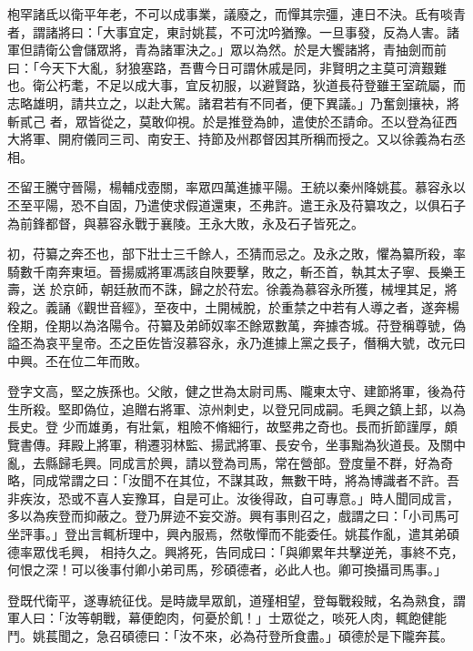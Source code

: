 \begin{pinyinscope}
 枹罕諸氐以衛平年老，不可以成事業，議廢之，而憚其宗彊，連日不決。氐有啖青者，謂諸將曰：「大事宜定，東討姚萇，不可沈吟猶豫。一旦事發，反為人害。諸軍但請衛公會儲眾將，青為諸軍決之。」眾以為然。於是大饗諸將，青抽劍而前曰：「今天下大亂，豺狼塞路，吾曹今日可謂休戚是同，非賢明之主莫可濟艱難也。衛公朽耄，不足以成大事，宜反初服，以避賢路，狄道長苻登雖王室疏屬，而志略雄明，請共立之，以赴大駕。諸君若有不同者，便下異議。」乃奮劍攘袂，將斬貳己
 者，眾皆從之，莫敢仰視。於是推登為帥，遣使於丕請命。丕以登為征西大將軍、開府儀同三司、南安王、持節及州郡督因其所稱而授之。又以徐義為右丞相。



 丕留王騰守晉陽，楊輔戍壺關，率眾四萬進據平陽。王統以秦州降姚萇。慕容永以丕至平陽，恐不自固，乃遣使求假道還東，丕弗許。遣王永及苻纂攻之，以俱石子為前鋒都督，與慕容永戰于襄陵。王永大敗，永及石子皆死之。



 初，苻纂之奔丕也，部下壯士三千餘人，丕猜而忌之。及永之敗，懼為纂所殺，率騎數千南奔東垣。晉揚威將軍馮該自陜要擊，敗之，斬丕首，執其太子寧、長樂王壽，送
 於京師，朝廷赦而不誅，歸之於苻宏。徐義為慕容永所獲，械埋其足，將殺之。義誦《觀世音經》，至夜中，土開械脫，於重禁之中若有人導之者，遂奔楊佺期，佺期以為洛陽令。苻纂及弟師奴率丕餘眾數萬，奔據杏城。苻登稱尊號，偽謚丕為哀平皇帝。丕之臣佐皆沒慕容永，永乃進據上黨之長子，僭稱大號，改元曰中興。丕在位二年而敗。



 登字文高，堅之族孫也。父敞，健之世為太尉司馬、隴東太守、建節將軍，後為苻生所殺。堅即偽位，追贈右將軍、涼州刺史，以登兄同成嗣。毛興之鎮上邽，以為長史。登
 少而雄勇，有壯氣，粗險不脩細行，故堅弗之奇也。長而折節謹厚，頗覽書傳。拜殿上將軍，稍遷羽林監、揚武將軍、長安令，坐事黜為狄道長。及關中亂，去縣歸毛興。同成言於興，請以登為司馬，常在營部。登度量不群，好為奇略，同成常謂之曰：「汝聞不在其位，不謀其政，無數干時，將為博識者不許。吾非疾汝，恐或不喜人妄豫耳，自是可止。汝後得政，自可專意。」時人聞同成言，多以為疾登而抑蔽之。登乃屏迹不妄交游。興有事則召之，戲謂之曰：「小司馬可坐評事。」登出言輒析理中，興內服焉，然敬憚而不能委任。姚萇作亂，遣其弟碩德率眾伐毛興，
 相持久之。興將死，告同成曰：「與卿累年共擊逆羌，事終不克，何恨之深！可以後事付卿小弟司馬，殄碩德者，必此人也。卿可換攝司馬事。」



 登既代衛平，遂專統征伐。是時歲旱眾飢，道殣相望，登每戰殺賊，名為熟食，謂軍人曰：「汝等朝戰，幕便飽肉，何憂於飢！」士眾從之，啖死人肉，輒飽健能鬥。姚萇聞之，急召碩德曰：「汝不來，必為苻登所食盡。」碩德於是下隴奔萇。




\end{pinyinscope}
